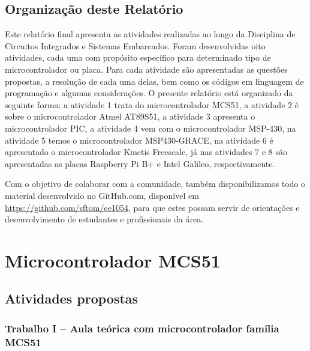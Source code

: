 \documentclass[
	12pt,				%
	openright,			%
  oneside,     %
	a4paper,			%
	english,			%
	french,				%
	spanish,			%
	brazil				%
	]{abntex2}
\begin{document}
\section*{Organização deste Relatório} %
\label{sec:organizacao_deste_relatorio}

Este relatório final apresenta as atividades realizadas ao longo da Disciplina de Circuitos Integrados e Sistemas Embarcados. Foram desenvolvidas oito atividades, cada uma com propósito específico para determinado tipo de microcontrolador ou placa. Para cada atividade são apresentadas as questões propostas, a resolução de cada uma delas, bem como os códigos em linguagem de programação e algumas considerações. O presente relatório está organizado da seguinte forma: a atividade 1 trata do microcontrolador MCS51, a atividade 2 é sobre o microcontrolador Atmel AT89S51, a atividade 3 apresenta o microcontrolador PIC, a atividade 4 vem com o microcontrolador MSP-430, na atividade 5 temos o microcontrolador MSP430-GRACE, na atividade 6 é apresentado o microcontrolador Kinetis Freescale, já nas atividades 7 e 8 são apresentadas as placas Raspberry Pi B+ e Intel Galileo, respectivamente.

Com o objetivo de colaborar com a comunidade, também disponibilizamos todo o material desenvolvido no GitHub.com, disponível em \url{https://github.com/sftom/ee1054}, para que estes possam servir de orientações e desenvolvimento de estudantes e profissionais da área.


%
%

\chapter{Microcontrolador MCS51} %
\label{cha:1-Familia-MCS51}

\section{Atividades propostas} %
\label{sec:atividades_propostas}

\subsection*{Trabalho I – Aula teórica com microcontrolador família MCS51}
\end{document}
